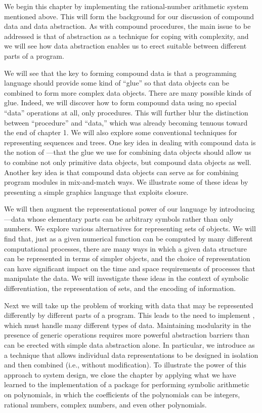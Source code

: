 We begin this chapter by implementing the rational-number arithmetic system mentioned above.
This will form the background for our discussion of compound data and data abstraction.
As with compound procedures, the main issue to be addressed is that of abstraction as a technique for coping with complexity, and we will see how data abstraction enables us to erect suitable  between different parts of a program.

We will see that the key to forming compound data is that a programming language should provide some kind of “glue” so that data objects can be combined to form more complex data objects.
There are many possible kinds of glue.
Indeed, we will discover how to form compound data using no special “data” operations at all, only procedures.
This will further blur the distinction between “procedure”  and  “data,” which was already becoming tenuous toward the end of chapter 1.
We will also explore some conventional techniques for representing sequences and trees.
One key idea in dealing with compound data is the notion of ---that the glue we use for combining data objects should allow us to combine not only primitive data objects, but compound data objects as well.
Another key idea is that compound data objects can serve as  for combining program modules in mix-and-match ways.
We illustrate some of these ideas by presenting a simple graphics language that exploits closure.

We will then augment the representational power of our language by introducing ---data whose elementary parts can be arbitrary symbols rather than only numbers.
We explore various alternatives for representing sets of objects.
We will find that, just as a given numerical function can be computed by many different computational processes, there are many ways in which a given data structure can be represented in terms of simpler objects, and the choice of representation can have significant impact on the time and space requirements of processes that manipulate the data.
We will investigate these ideas in the context of symbolic differentiation, the representation of sets, and the encoding of information.

Next we will take up the problem of working with data that may be represented differently by different parts of a program.
This leads to the need to implement , which must handle many different types of data.
Maintaining modularity in the presence of generic operations requires more powerful abstraction barriers than can be erected with simple data abstraction alone.
In particular, we introduce  as a technique that allows individual data representations to be designed in isolation and then combined  (i.e., without modification).
To illustrate the power of this approach to system design, we close the chapter by applying what we have learned to the implementation of a package for performing symbolic arithmetic on polynomials, in which the coefficients of the polynomials can be integers, rational numbers, complex numbers, and even other polynomials.






